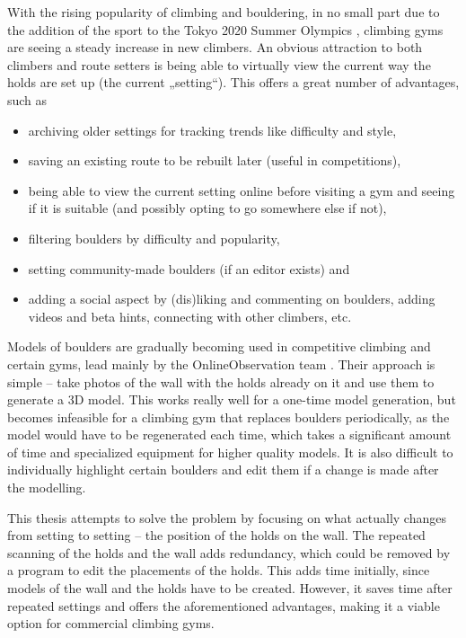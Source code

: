 
With the rising popularity of climbing and bouldering, in no small part due to the addition of the sport to the Tokyo 2020 Summer Olympics \cite{olympics}, climbing gyms are seeing a steady increase in new climbers.
An obvious attraction to both climbers and route setters is being able to virtually view the current way the holds are set up (the current „setting“).
This offers a great number of advantages, such as

\begin{itemize}
	\item archiving older settings for tracking trends like difficulty and style,
	\item saving an existing route to be rebuilt later (useful in competitions),
	\item being able to view the current setting online before visiting a gym and seeing if it is suitable (and possibly opting to go somewhere else if not),
	\item filtering boulders by difficulty and popularity,
	\item setting community-made boulders (if an editor exists) and
	\item adding a social aspect by (dis)liking and commenting on boulders, adding videos and beta hints, connecting with other climbers, etc.
\end{itemize}

Models of boulders are gradually becoming used in competitive climbing and certain gyms, lead mainly by the OnlineObservation team \cite{onlineobservation}.
Their approach is simple -- take photos of the wall with the holds already on it and use them to generate a 3D model.
This works really well for a one-time model generation, but becomes infeasible for a climbing gym that replaces boulders periodically, as the model would have to be regenerated each time, which takes a significant amount of time and specialized equipment for higher quality models.
It is also difficult to individually highlight certain boulders and edit them if a change is made after the modelling.

This thesis attempts to solve the problem by focusing on what actually changes from setting to setting -- the position of the holds on the wall.
The repeated scanning of the holds and the wall adds redundancy, which could be removed by a program to edit the placements of the holds.
This adds time initially, since models of the wall and the holds have to be created.
However, it saves time after repeated settings and offers the aforementioned advantages, making it a viable option for commercial climbing gyms.

